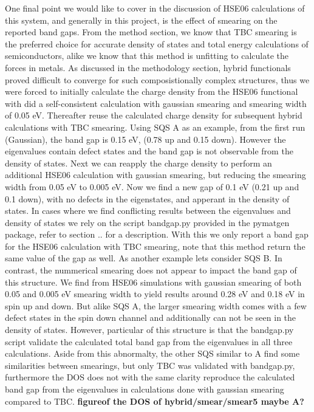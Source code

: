 One final point we would like to cover in the discussion of HSE06 calculations of this system, and generally in this project, is the effect of smearing on the reported band gaps. From the method section, we know that TBC smearing is the preferred choice for accurate density of states and total energy calculations of semiconductors, alike we know that this method is unfitting to calculate the forces in metals. As discussed in the methodology section, hybrid functionals proved difficult to converge for such composistionally complex structures, thus we were forced to initially calculate the charge density from the HSE06 functional with did a self-consistent calculation with gaussian smearing and smearing width of 0.05 eV. Thereafter reuse the calculated charge density for subsequent hybrid calculations with TBC smearing. Using SQS A as an example, from the first run (Gaussian), the band gap is 0.15 eV, (0.78 up and 0.15 down). However the eigenvalues contain defect states and the band gap is not observable from the density of states. Next we can reapply the charge density to perform an additional HSE06 calculation with gaussian smearing, but reducing the smearing width from 0.05 eV to 0.005 eV. Now we find a new gap of 0.1 eV (0.21 up and 0.1 down), with no defects in the eigenstates, and apperant in the density of states. In cases where we find conflicting results between the eigenvalues and density of states we rely on the script bandgap.py provided in the pymatgen package, refer to section .. for a description. With this we only report a band gap for the HSE06 calculation with TBC smearing, note that this method return the same value of the gap as well. As another example lets consider SQS B. In contrast, the nummerical smearing does not appear to impact the band gap of this structure. We find from HSE06 simulations with gaussian smearing of both 0.05 and 0.005 eV smearing width to yield results around 0.28 eV and 0.18 eV in spin up and down. But alike SQS A, the larger smearing width comes with a few defect states in the spin down channel and additionally can not be seen in the density of states. However, particular of this structure is that the bandgap.py script validate the calculated total band gap from the eigenvalues in all three calculations. Aside from this abnormalty, the other SQS similar to A find some similarities between smearings, but only TBC was validated with bandgap.py, furthermore the DOS does not with the same clarity reproduce the calculated band gap from the eigenvalues in calculations done with gaussian smearing compared to TBC. \textbf{figureof the DOS of hybrid/smear/smear5 maybe A?}

